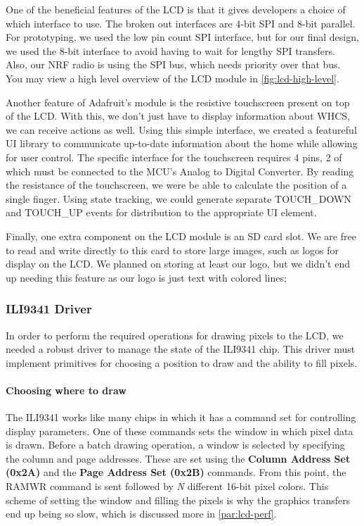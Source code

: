 One of the beneficial features of the LCD is that it gives developers a choice
of which interface to use. The broken out interfaces are 4-bit SPI and 8-bit
parallel. For prototyping, we used the low pin count SPI interface, but for our
final design, we used the 8-bit interface to avoid having to wait for
lengthy SPI transfers. Also, our NRF radio is using the SPI bus, which
needs priority over that bus. You may view a high level overview of
the LCD module in \autoref{fig:lcd-high-level}.


Another feature of Adafruit's module is the resistive touchscreen present on top of the
LCD. With this, we don't just have to display information about WHCS, we can
receive actions as well. Using this simple interface, we created a
featureful UI library to communicate up-to-date information about the home
while allowing for user control. The specific interface for the touchscreen
requires 4 pins, 2 of which must be connected to the MCU's Analog to Digital
Converter. By reading the resistance of the touchscreen, we were be able to
calculate the position of a single finger. Using state tracking, we could
generate separate TOUCH\_DOWN and TOUCH\_UP events for distribution to the
appropriate UI element.

Finally, one extra component on the LCD module is an SD card slot. We are free
to read and write directly to this card to store large images, such as logos
for display on the LCD. We planned on storing at least our logo, but we didn't
end up needing this feature as our logo is just text with colored lines;

\subsubsection{ILI9341 Driver}
\label{sec:lcd-driver}

In order to perform the required operations for drawing pixels to the LCD, we
needed a robust driver to manage the state of the ILI9341 chip. This driver must
implement primitives for choosing a position to draw and the ability to fill
pixels.

\paragraph{Choosing where to draw}
The ILI9341 works like many chips in which it has a command set for controlling
display parameters. One of these commands sets the window in which pixel
data is drawn. Before a batch drawing operation, a window is selected by
specifying the column and page addresses. These are set using the
\textbf{Column Address Set (0x2A)} and the \textbf{Page Address Set (0x2B)}
commands. From this point, the RAMWR command is sent followed by \emph{N}
different 16-bit pixel colors. This scheme of setting the window and filling
the pixels is why the graphics transfers end up being so slow, which is
discussed more in \autoref{par:lcd-perf}.

